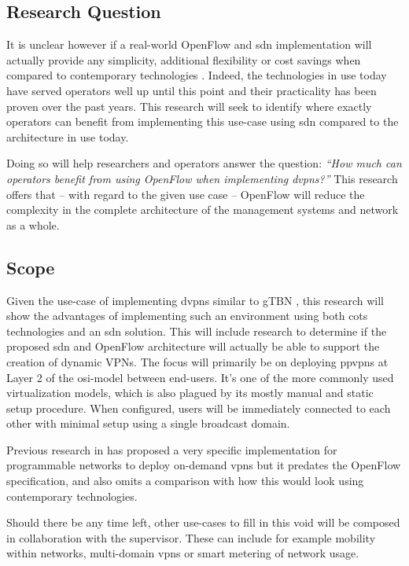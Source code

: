 	\subsection*{Research Question} %
	\label{sub:research_question}
	It is unclear however if a real-world OpenFlow and \ac{sdn} implementation will actually provide any simplicity, additional flexibility or cost savings when compared to contemporary technologies \cite{programmability-answer}. Indeed, the technologies in use today have served operators well up until this point and their practicality has been proven over the past years. 
	This research will seek to identify where exactly operators can benefit from implementing this use-case using \ac{sdn} compared to the architecture in use today. 

	Doing so will help researchers and operators answer the question: \textsl{``How much can operators benefit from using OpenFlow when implementing \acp{dvpn}?''}
	This research offers that -- with regard to the given use case -- OpenFlow will reduce the complexity in the complete architecture of the management systems and network as a whole.


	\subsection*{Scope} %
	\label{sub:scope}
	Given the use-case of implementing \acp{dvpn} similar to gTBN \cite{gtbn}, this research will show the advantages of implementing such an environment using both \ac{cots} technologies and an \ac{sdn} solution. This will include research to determine if the proposed \ac{sdn} and OpenFlow architecture will actually be able to support the creation of dynamic VPNs. The focus will primarily be on deploying \acp{ppvpn} at Layer 2 of the \acs{osi}-model between end-users. It's one of the more commonly used virtualization models, which is also plagued by its mostly manual and static setup procedure. When configured, users will be immediately connected to each other with minimal setup using a single broadcast domain.
	
	Previous research in \cite{net-prog-vpn} has proposed a very specific implementation for programmable networks to deploy on-demand \acp{vpn} but it predates the OpenFlow specification, and also omits a comparison with how this would look using contemporary technologies.

	Should there be any time left, other use-cases to fill in this void will be composed in collaboration with the supervisor. These can include for example mobility within networks, multi-domain \acp{vpn} or smart metering of network usage.

